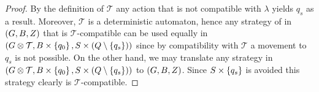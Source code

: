 \begin{proof}
  By the definition of $\mathcal{T}$ any action that is not compatible with 
  $\lambda$ yields $q_{s}$ as a result. Moreover, $\mathcal{T}$ is a
  deterministic automaton, hence any strategy of \eve{} in $\left(G, B, Z\right)$ 
  that is $\mathcal{T}$-compatible can be used equally in 
  $\left(G\otimes\mathcal{T}, B\times\left\{q_{0}\right\}, 
    S\times\left(Q\setminus\left\{q_{s}\right\}\right)\right)$ since by compatibility with 
  $\mathcal{T}$ a movement to $q_{s}$ is not possible. On the other hand, we 
  may translate any strategy in $\left(G\otimes\mathcal{T}, 
  B\times\left\{q_{0}\right\}, S\times\left(Q\setminus\left\{q_{s}\right\}\right)\right)$ to 
  $\left(G, B, Z\right)$. Since $S\times\left\{q_{s}\right\}$ is avoided this strategy 
  clearly is $\mathcal{T}$-compatible.
\end{proof}

